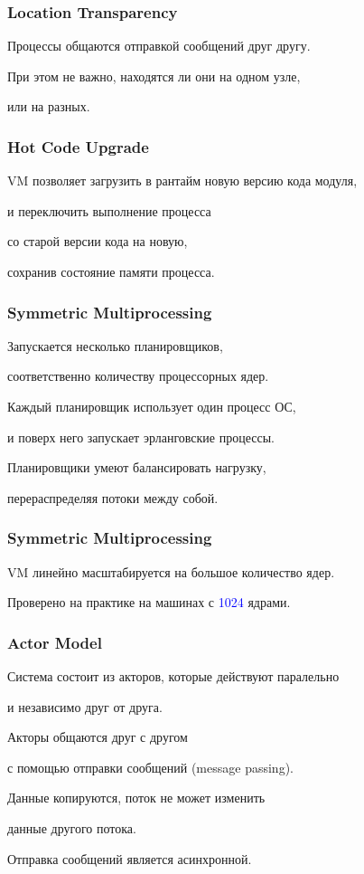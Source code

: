 \documentclass[10pt]{beamer}
\begin{document}
\begin{frame}
\frametitle{Location Transparency}
\centering
Процессы общаются отправкой сообщений друг другу.
\par \bigskip
При этом не важно, находятся ли они на одном узле,
\par \bigskip
или на разных.
\end{frame}

\begin{frame}
\frametitle{Hot Code Upgrade}
\centering
VM позволяет загрузить в рантайм новую версию кода модуля,
\par \bigskip
и переключить выполнение процесса
\par \bigskip
со старой версии кода на новую,
\par \bigskip
сохранив состояние памяти процесса.
\end{frame}

\begin{frame}
\frametitle{Symmetric Multiprocessing}
\centering
Запускается несколько планировщиков,
\par
соответственно количеству процессорных ядер.
\par \bigskip
Каждый планировщик использует один процесс ОС,
\par
и поверх него запускает эрланговские процессы.
\par \bigskip
Планировщики умеют балансировать нагрузку,
\par
перераспределяя потоки между собой.
\end{frame}

\begin{frame}
\frametitle{Symmetric Multiprocessing}
\centering
VM линейно масштабируется на большое количество ядер.
\par \bigskip
Проверено на практике на машинах с \textcolor{blue}{1024} ядрами.
\end{frame}

\begin{frame}
\frametitle{Actor Model}
\centering
Система состоит из акторов, которые действуют паралельно
\par
и независимо друг от друга.
\par \bigskip
Акторы общаются друг с другом
\par
с помощью отправки сообщений (message passing).
\par \bigskip
Данные копируются, поток не может изменить
\par
данные другого потока.
\par \bigskip
Отправка сообщений является асинхронной.
\end{frame}
\end{document}
